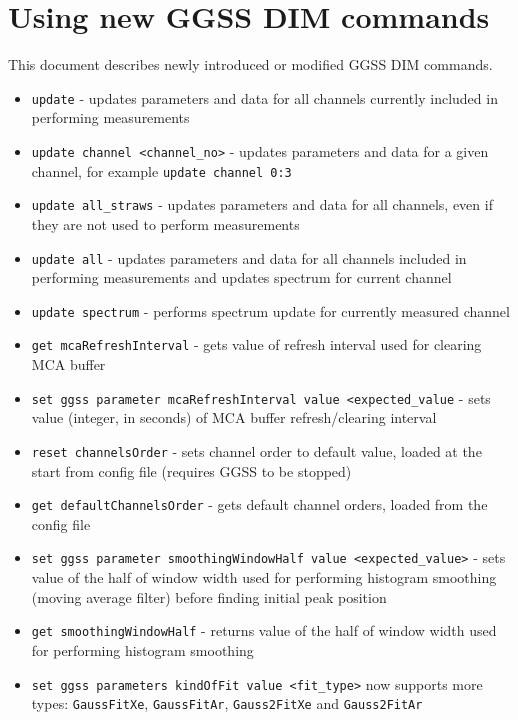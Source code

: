 \clearpage
\section{Using new GGSS DIM commands}
This document describes newly introduced or modified GGSS DIM commands.

\begin{itemize}
    \item \lstinline{update} - updates parameters and data for all channels currently included in performing measurements
    \item \lstinline{update channel <channel_no>} - updates parameters and data for a given channel, for example \lstinline{update channel 0:3}
    \item \lstinline{update all_straws} - updates parameters and data for all channels, even if they are not used to perform measurements
    \item \lstinline{update all} - updates parameters and data for all channels included in performing measurements and updates spectrum for current channel
    \item \lstinline{update spectrum} - performs spectrum update for currently measured channel
    \item \lstinline{get mcaRefreshInterval} - gets value of refresh interval used for clearing MCA buffer
    \item \lstinline{set ggss parameter mcaRefreshInterval value <expected_value} - sets value (integer, in seconds) of MCA buffer refresh/clearing interval
    \item \lstinline{reset channelsOrder} - sets channel order to default value, loaded at the start from config file (requires GGSS to be stopped)
    \item \lstinline{get defaultChannelsOrder} - gets default channel orders, loaded from the config file
    \item \lstinline{set ggss parameter smoothingWindowHalf value <expected_value>} - sets value of the half of window width used for performing histogram smoothing (moving average filter) before finding initial peak position
    \item \lstinline{get smoothingWindowHalf} - returns value of the half of window width used for performing histogram smoothing
    \item \lstinline{set ggss parameters kindOfFit value <fit_type>} now supports more types: \lstinline{GaussFitXe}, \lstinline{GaussFitAr}, \lstinline{Gauss2FitXe} and \lstinline{Gauss2FitAr}
\end{itemize}
